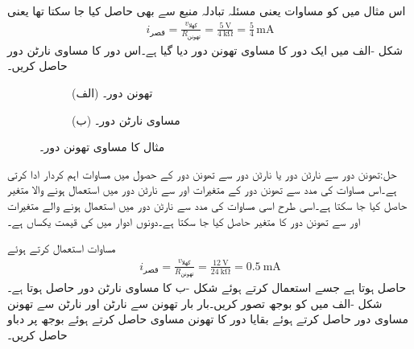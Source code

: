اس مثال میں  کو مساوات  یعنی مسئلہ تبادلہ منبع سے بھی حاصل کیا جا سکتا تھا یعنی
\begin{align*}
i_{\text{قصر}}=\frac{v_{\text{کھلا}}}{R_{\text{تھونن}}}=\frac{\SI{5}{\volt}}{\SI{4}{\kilo\ohm}}=\frac{5}{4} \, \si{\milli\ampere}
\end{align*}
شکل -الف میں ایک دور کا مساوی تھونن دور دیا گیا ہے۔اس دور کا مساوی نارٹن دور حاصل کریں۔
\begin{figure}
\centering
\begin{subfigure}{0.5\textwidth}
\centering
{}
\caption*{(الف) تھونن دور۔}
\end{subfigure}%
\begin{subfigure}{0.5\textwidth}
\centering
{}
\caption*{(ب) مساوی نارٹن دور۔}
\end{subfigure}%
\caption{مثال  کا مساوی تھونن دور۔}
\label{شکل_مثال_تھونن_سے_نارٹن_الف}
\end{figure}

حل:تھونن دور سے نارٹن دور یا نارٹن دور سے تھونن دور کے حصول میں مساوات  اہم کردار ادا کرتی ہے۔اس مساوات کی مدد سے  تھونن دور کے متغیرات   اور  سے نارٹن دور میں استعمال ہونے والا متغیر  حاصل کیا جا سکتا ہے۔اسی طرح اسی مساوات کی مدد سے نارٹن دور میں استعمال ہونے والے متغیرات  اور    سے تھونن دور کا متغیر   حاصل کیا جا سکتا ہے۔دونوں ادوار میں  کی قیمت یکساں ہے۔

مساوات  استعمال کرتے ہوئے
\begin{align*}
i_{\text{قصر}} = \frac{v_{\text{کھلا}}}{R_{\text{تھونن}}}=\frac{\SI{12}{\volt}}{\SI{24}{\kilo\ohm}}=\SI{0.5}{\milli\ampere}
\end{align*}
حاصل ہوتا ہے جسے استعمال کرتے ہوئے  شکل -ب کا مساوی نارٹن دور حاصل ہوتا ہے۔ 
شکل -الف میں  کو بوجھ تصور کریں۔بار بار تھونن سے نارٹن اور نارٹن سے تھونن مساوی دور حاصل کرتے ہوئے بقایا دور کا  تھونن مساوی حاصل کرتے ہوئے بوجھ پر دباو حاصل کریں۔

